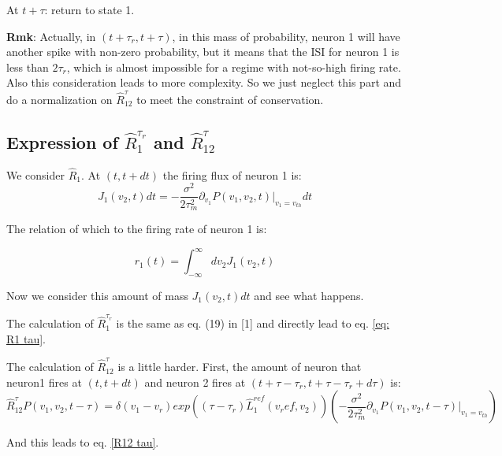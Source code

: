 \documentclass{article}
\begin{document}
	At $t+\tau$: return to state 1.
	
	\textbf{Rmk}: Actually, in $(t+\tau_r,t+\tau)$, in this mass of probability, neuron 1 will have another spike with non-zero probability, but it means that the ISI for neuron 1 is less than $2\tau_r$, which is almost impossible for a regime with not-so-high firing rate. Also this consideration leads to more complexity. So we just neglect this part and do a normalization on $\hat{R}_{12}^{\tau}$ to meet the constraint of conservation.
	
	\subsection{Expression of $\hat{R}_{1}^{\tau_r}$ and $\hat{R}_{12}^{\tau}$}
	
	We consider $\hat{R}_1$. At $(t,t+dt)$ the firing flux of neuron 1 is:
	\begin{equation}
		J_1(v_2,t)dt=-\frac{\sigma^2}{2\tau_m^2}\partial_{v_1}P(v_1,v_2,t)|_{v_1=v_{th}}dt
	\end{equation}
	
	The relation of which to the firing rate of neuron 1 is:
	
	\begin{equation}
		r_1(t)=\int_{-\infty}^{\infty}dv_2J_1(v_2,t)
	\end{equation}
	
	Now we consider this amount of mass $J_1(v_2,t)dt$ and see what happens.
	
	The calculation of $\hat{R}_1^{\tau_r}$ is the same as eq. (19) in [1] and directly lead to eq. \eqref{eq: R1 tau}.
	
	The calculation of $\hat{R}_{12}^{\tau}$ is a little harder. First, the amount of neuron that neuron1 fires at $(t,t+dt)$ and neuron 2 fires at $(t+\tau-\tau_r,t+\tau-\tau_r+d\tau)$ is:
	\begin{equation}
		\hat{R}_{12}^{\tau}P(v_1,v_2,t-\tau)=\delta(v_1-v_r)exp((\tau-\tau_r)\hat{L}_1^{ref}(v_ref,v_2))(-\frac{\sigma^2}{2\tau_m^2}\partial_{v_1}P(v_1,v_2,t-\tau)|_{v_1=v_{th}})
	\end{equation}
	
	And this leads to eq. \eqref{R12 tau}.
\end{document}
